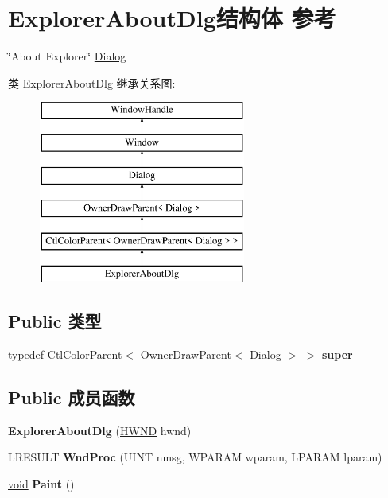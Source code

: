 \hypertarget{struct_explorer_about_dlg}{}\section{Explorer\+About\+Dlg结构体 参考}
\label{struct_explorer_about_dlg}


\char`\"{}\+About Explorer\char`\"{} \hyperlink{struct_dialog}{Dialog}  


类 Explorer\+About\+Dlg 继承关系图\+:\begin{figure}[H]
\begin{center}
\leavevmode
\includegraphics[height=6.000000cm]{struct_explorer_about_dlg}
\end{center}
\end{figure}
\subsection*{Public 类型}
\begin{DoxyCompactItemize}
\item 
\mbox{\label{struct_explorer_about_dlg_a9711db592b201da260d8bb39bb0aa38b}} 
typedef \hyperlink{struct_ctl_color_parent}{Ctl\+Color\+Parent}$<$ \hyperlink{struct_owner_draw_parent}{Owner\+Draw\+Parent}$<$ \hyperlink{struct_dialog}{Dialog} $>$ $>$ {\bfseries super}
\end{DoxyCompactItemize}
\subsection*{Public 成员函数}
\begin{DoxyCompactItemize}
\item 
\mbox{\label{struct_explorer_about_dlg_a98a5066ae4229bb1a59793de763e2878}} 
{\bfseries Explorer\+About\+Dlg} (\hyperlink{interfacevoid}{H\+W\+ND} hwnd)
\item 
\mbox{\label{struct_explorer_about_dlg_a0566426029aa5f75e21176f0ab8d3cae}} 
L\+R\+E\+S\+U\+LT {\bfseries Wnd\+Proc} (U\+I\+NT nmsg, W\+P\+A\+R\+AM wparam, L\+P\+A\+R\+AM lparam)
\item 
\mbox{\label{struct_explorer_about_dlg_a44143c976d959d1592acef0240b5e72b}} 
\hyperlink{interfacevoid}{void} {\bfseries Paint} ()
\end{DoxyCompactItemize}
